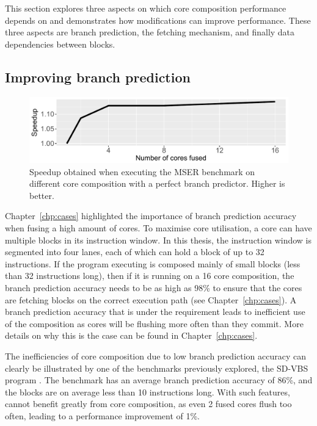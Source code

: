 This section explores three aspects on which core composition performance depends on and demonstrates how modifications can improve performance.
These three aspects are branch prediction, the fetching mechanism, and finally data dependencies between blocks.

\subsection{Improving branch prediction}

\begin{figure}[t]
    \centering
    \includegraphics[width=1\textwidth]{chapter3/graphics/motiv_branch_mser.pdf}
    \caption{Speedup obtained when executing the MSER benchmark on different core composition with a perfect branch predictor. Higher is better.}
    \label{fig:mser_motiv}
	\vspace{1em}
\end{figure}
Chapter~\ref{chp:cases} highlighted the importance of branch prediction accuracy when fusing a high amount of cores.
To maximise core utilisation, a core can have multiple blocks in its instruction window.
In this thesis, the instruction window is segmented into four lanes, each of which can hold a block of up to 32 instructions.
If the program executing is composed mainly of small blocks (less than 32 instructions long), then if it is running on a 16 core composition, the branch prediction accuracy needs to be as high as 98\% to ensure that the cores are fetching blocks on the correct execution path (see Chapter~\ref{chp:cases}).
A branch prediction accuracy that is under the requirement leads to inefficient use of the composition as cores will be flushing more often than they commit.
More details on why this is the case can be found in Chapter~\ref{chp:cases}.

The inefficiencies of core composition due to low branch prediction accuracy can clearly be illustrated by one of the benchmarks previously explored, the SD-VBS program .
The benchmark has an average branch prediction accuracy of 86\%, and the blocks are on average less than 10 instructions long.
With such features,  cannot benefit greatly from core composition, as even 2 fused cores flush too often, leading to a performance improvement of 1\%.

